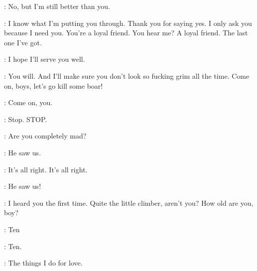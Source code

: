 \NED: No, but I'm still better than you. 

\ROBERT: I know what I'm putting you through. Thank you for saying yes. I only ask you because I need you. You're a loyal friend. You hear me? A loyal friend. The last one I've got. 

\NED: I hope I'll serve you well. 

\ROBERT: You will. And I'll make sure you don't look so fucking grim all the time. Come on, boys, let's go kill some boar! 


\BRAN: Come on, you. 


\CERSEI:  Stop. STOP. 


\JAIME: Are you completely mad? 

\CERSEI: He saw us. 

\JAIME: It's all right. It's all right. 

\CERSEI: He saw us! 

\JAIME: I heard you the first time.  Quite the little climber, aren't you? How old are you, boy? 

\BRAN: Ten 

\JAIME: Ten. 


\JAIME: The things I do for love. 



